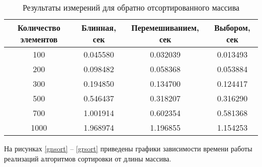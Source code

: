 \begin{table}[H]
	\begin{center}
		\captionsetup{justification=raggedright,singlelinecheck=off}
		\caption{\label{trsort}Результаты измерений для обратно отсортированного массива}
		\begin{tabular}{|c|c|c|c|}
			\hline
			Количество элементов & Блинная, сек & Перемешиванием, сек & Выбором, сек \\
			\hline
			100 & 0.045580 & 0.032039 & 0.013493 \\
			\hline
			200 & 0.098482 & 0.058368 & 0.053884 \\
			\hline
			300 & 0.194850 & 0.134700 & 0.124417 \\
			\hline
			500 & 0.546437 & 0.318207 & 0.316290 \\
			\hline
			700 & 1.001914 & 0.602354 & 0.581368 \\
			\hline
			1000 & 1.968974 & 1.196855 & 1.154253 \\
			\hline
		\end{tabular}
	\end{center}
\end{table}

На рисунках \ref{gnsort} -- \ref{grsort} приведены графики зависимости времени работы реализаций алгоритмов сортировки от длины массива.

